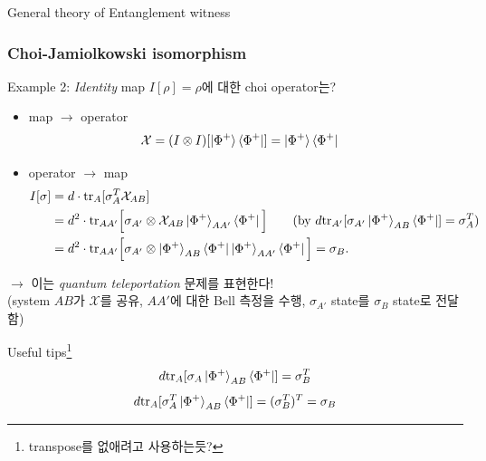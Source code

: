 \documentclass[9pt]{beamer}
\begin{document}
\begin{section}{General theory of  Entanglement witness}
        \begin{frame}
            \frametitle{Choi-Jamiolkowski isomorphism}
            Example 2: \textit{Identity} map $I[\rho] = \rho$에 대한 choi operator는?
            \begin{itemize}
                \item map $\rightarrow$ operator 
                \begin{align*}
                    \mathcal X &= (I\otimes I)[\ket{\Phi^+}\bra{\Phi^+}]  = \ket{\Phi^+} \bra{\Phi^+}
                \end{align*}
                \item operator $\rightarrow$ map
                \begin{align*}
                    I[\sigma] &= d \cdot \text{tr}_A [\sigma_A^T \mathcal{X}_{AB}]  \\
                                &= d^2 \cdot \text{tr}_{AA'}\Big[\sigma_{A'}\otimes \mathcal X_{AB} \ket{\Phi^+}_{AA'}\bra{\Phi^+}\Big] \qquad (\text{by } d\text{tr}_{A'}[\sigma_{A'} \ket{\Phi^+}_{AB}\bra{\Phi^+}] = \sigma_A^T) \\
                                &= d^2 \cdot \text{tr}_{AA'}\Big[\sigma_{A'}\otimes \ket{\Phi^+}_{AB}\bra{\Phi^+}\ket{\Phi^+}_{AA'}\bra{\Phi^+}\Big] = \sigma_B.
                \end{align*}
            \end{itemize}
            $\rightarrow$ 이는 \textit{quantum teleportation} 문제를 표현한다! \\
            (system $AB$가 $\mathcal X$를 공유, $AA'$에 대한 Bell 측정을 수행, $\sigma_{A'}$ state를 $\sigma_B$ state로 전달함)
            \begin{block}{Useful tips}\footnote{transpose를 없애려고 사용하는듯?}
                \vspace{-0.4cm}
                \begin{equation*}
                    d \text{tr}_A [\sigma_A \ket{\Phi^+}_{AB} \bra{\Phi^+}] = \sigma_B^T
                \end{equation*} 
                \begin{equation*}
                    d \text{tr}_A [\sigma_A^T \ket{\Phi^+}_{AB} \bra{\Phi^+}] = (\sigma_B^T)^T = \sigma_B
                \end{equation*} 
            \end{block}
        \end{frame}
    \end{section}
\end{document}
